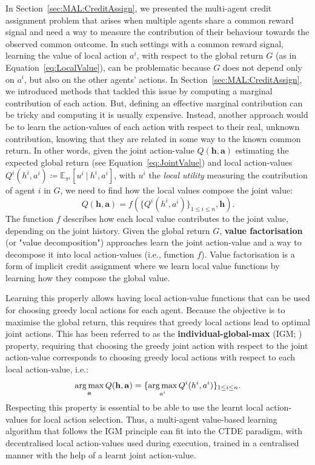 In Section~\ref{sec:MAL:CreditAssign}, we presented the multi-agent credit assignment problem that arises when multiple agents share a common reward signal and need a way to measure the contribution of their behaviour towards the observed common outcome. 
In such settings with a common reward signal, learning the value of local action $a^i$, with respect to the global return $G$ (as in Equation~\ref{eq:LocalValue}), can be problematic because $G$ does not depend only on $a^i$, but also on the other agents' actions. 
In Section~\ref{sec:MAL:CreditAssign}, we introduced methods that tackled this issue by computing a marginal contribution of each action. But, defining an effective marginal contribution can be tricky and computing it is usually expensive. 
Instead, another approach would be to learn the action-values of each action with respect to their real, unknown contribution, knowing that they are related in some way to the known common return. In other words, given the joint action-value $Q(\mathbf{h},\mathbf{a})$ estimating the expected global return (see Equation~\ref{eq:JointValue}) and local action-values $Q^i(h^i,a^i)\coloneqq\mathbb{E}_{\pi^i}[u^i\ |\ h^i,a^i]$, with $u^i$ the \textit{local utility} measuring the contribution of agent $i$ in $G$, we need to find how the local values compose the joint value:
\begin{equation}
    Q(\mathbf{h},\mathbf{a})=f(\{Q^i(h^i,a^i)\}_{1\leq i\leq n},\mathbf{h}).
\end{equation}
The function $f$ describes how each local value contributes to the joint value, depending on the joint history. Given the global return $G$, \textbf{value factorisation} (or "value decomposition") approaches learn the joint action-value and a way to decompose it into local action-values (i.e., function $f$). Value factorisation is a form of implicit credit assignment where we learn local value functions by learning how they compose the global value. 

Learning this properly allows having local action-value functions that can be used for choosing greedy local actions for each agent. Because the objective is to maximise the global return, this requires that greedy local actions lead to optimal joint actions. This has been referred to as the \textbf{individual-global-max} (IGM; \cite{Rashid2018_QMIX}) property, requiring that choosing the greedy joint action with respect to the joint action-value corresponds to choosing greedy local actions with respect to each local action-value, i.e.:
\begin{equation}
    \operatorname*{arg\,max}_\mathbf{a}Q(\mathbf{h},\mathbf{a})=\{\operatorname*{arg\,max}_{a^i}Q^i(h^i,a^i)\}_{1\leq i\leq n}. \label{eq:IGM}
\end{equation}
Respecting this property is essential to be able to use the learnt local action-values for local action selection. Thus, a multi-agent value-based learning algorithm that follows the IGM principle can fit into the CTDE paradigm, with decentralised local action-values used during execution, trained in a centralised manner with the help of a learnt joint action-value. 

